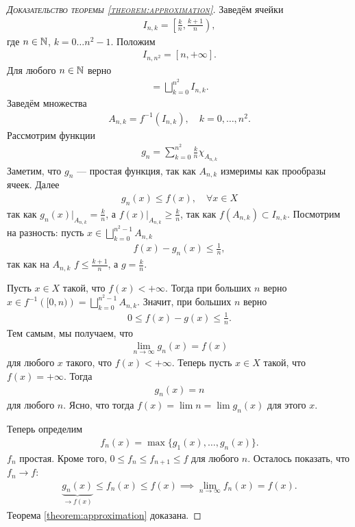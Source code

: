 \documentclass[a4paper,14pt]{extarticle}
\theoremstyle{definition}
\theoremstyle{plain}
\theoremstyle{plain}
\theoremstyle{plain}
\theoremstyle{plain}
\theoremstyle{definition}
\theoremstyle{definition}
\theoremstyle{definition}
\theoremstyle{definition}
\theoremstyle{definition}
\theoremstyle{definition}
\theoremstyle{plain}
\theoremstyle{plain}
\theoremstyle{plain}
\theoremstyle{plain}
\theoremstyle{definition}
\theoremstyle{definition}
\theoremstyle{definition}
\theoremstyle{definition}
\theoremstyle{definition}
\newcommand{\N}{\ensuremath \mathbb{N}}
\begin{document}
\begin{proof}[\textsc{Доказательство теоремы \ref{theorem:approximation}}]
 Заведём ячейки \begin{align*}
  I_{n,k} = \left[\frac{k}{n}, \frac{k+1}{n}\right)
 ,\end{align*} где $n \in \N$, $k = 0 \ldots n^{2} - 1$. Положим \begin{align*}
 I_{n,n^{2}} = [n, +\infty]
 .\end{align*} Для любого $n \in \N$ верно \begin{align*}
 [0, +\infty] = \bigsqcup_{k=0}^{n^{2}} I_{n,k}
 .\end{align*} Заведём множества \begin{align*}
 A_{n,k} = f^{-1} \left( I_{n,k} \right), \quad k = 0, \ldots, n^{2}
 .\end{align*}  Рассмотрим функции \begin{align*}
 g_n = \sum_{k=0}^{n^{2}} \frac{k}{n} \chi_{A_{n,k}}
\end{align*} Заметим, что $g_n$ --- простая функция, так как $A_{n,k}$ измеримы как прообразы ячеек. Далее  \begin{align*}
 g_n(x) \leqslant f(x), \quad \forall x \in X
 \end{align*} так как $g_n(x) \rvert_{A_{n,k}} = \frac{k}{n}$, а $f(x) \rvert_{A_{n,k}} \geqslant \frac{k}{n}$, так как $f(A_{n,k}) \subset I_{n,k}$. Посмотрим на разность: пусть $x \in \bigsqcup_{k=0}^{n^{2} - 1} A_{n,k} $\begin{align*}
 f(x) - g_n(x) \leqslant \frac{1}{n}
,\end{align*} так как на $A_{n,k}$  $f \leqslant \frac{k+1}{n}$, а $g  = \frac{k}{n}$.

Пусть $x \in X$ такой, что $f(x) < +\infty$. Тогда при больших $n$ верно $x \in f^{-1} \left( [0, n) \right) = \bigsqcup_{k=0}^{n^{2}-1} A_{n,k} $. Значит, при больших $n$ верно \begin{align*}
 0 \leqslant f(x) - g(x) \leqslant \frac{1}{n}
.\end{align*} Тем самым, мы получаем, что \begin{align*}
\lim\limits_{n \to \infty} g_n(x) = f(x)
\end{align*} для любого $x$ такого, что  $f(x) < +\infty $. Теперь пусть  $x \in X$ такой, что $f(x) = +\infty$. Тогда  \begin{align*}
 g_n(x) = n
\end{align*} для любого $n$. Ясно, что тогда $f(x) = \lim n = \lim g_n(x)$ для этого $x$.

Теперь определим \begin{align*}
 f_n(x) = \max\{g_1(x), \ldots, g_n(x)\}
.\end{align*} $f_n$ простая. Кроме того, $0 \leqslant f_n \leqslant f_{n+1} \leqslant f$ для любого $n$. Осталось показать, что $f_n \to f$: \begin{align*}
\underbrace{g_n(x)}_{\to f(x)} \leqslant f_n(x) \leqslant f(x) \implies \lim\limits_{n \to \infty} f_n(x) = f(x)
.\end{align*} Теорема \ref{theorem:approximation} доказана.
\end{proof}
\end{document}
